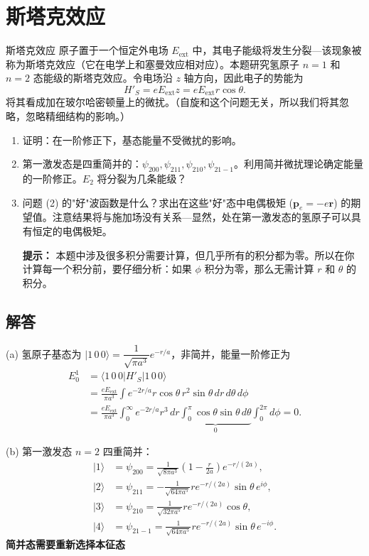 \section{斯塔克效应}
\begin{problembox}{斯塔克效应}
	原子置于一个恒定外电场 $E_{\mathrm{ext}}$ 中，其电子能级将发生分裂---该现象被称为斯塔克效应（它在电学上和塞曼效应相对应）。本题研究氢原子 $n=1$ 和 $n=2$ 态能级的斯塔克效应。令电场沿 $z$ 轴方向，因此电子的势能为
	\[
	H'_S = e E_{\mathrm{ext}} z = e E_{\mathrm{ext}} r \cos\theta.
	\]
	将其看成加在玻尔哈密顿量上的微扰。（自旋和这个问题无关，所以我们将其忽略，忽略精细结构的影响。）
	
	\begin{enumerate}
		\item 证明：在一阶修正下，基态能量不受微扰的影响。
		
		\item 第一激发态是四重简并的：$\psi_{200}, \psi_{211}, \psi_{210}, \psi_{21-1}$。利用简并微扰理论确定能量的一阶修正。$E_2$ 将分裂为几条能级？
		
		\item 问题 (2) 的"好"波函数是什么？求出在这些"好"态中电偶极矩 ($\mathbf{p}_e = -e\mathbf{r}$) 的期望值。注意结果将与施加场没有关系---显然，处在第一激发态的氢原子可以具有恒定的电偶极矩。
		
		\textbf{提示：} 本题中涉及很多积分需要计算，但几乎所有的积分都为零。所以在你计算每一个积分前，要仔细分析：如果 $\phi$ 积分为零，那么无需计算 $r$ 和 $\theta$ 的积分。
	\end{enumerate}
\end{problembox}

\subsection*{解答}

(a) 氢原子基态为 $|1\,0\,0\rangle = \dfrac{1}{\sqrt{\pi a^3}} e^{-r/a}$，非简并，能量一阶修正为
\begin{align*}
	E_0^1 &= \langle 1\,0\,0 | H'_S | 1\,0\,0 \rangle \\
	&= \frac{e E_{\mathrm{ext}}}{\pi a^3} \int e^{-2r/a} r \cos\theta \, r^2 \sin\theta \, dr\, d\theta\, d\phi \\
	&= \frac{e E_{\mathrm{ext}}}{\pi a^3} \int_0^\infty e^{-2r/a} r^3 \, dr \underbrace{\int_0^\pi \cos\theta \sin\theta \, d\theta}_{0} \int_0^{2\pi} d\phi = 0.
\end{align*}

(b) 第一激发态 \(n=2\) 四重简并：
\begin{align*}
	|1\rangle &= \psi_{200} = \frac{1}{\sqrt{8\pi a^3}} \left(1 - \frac{r}{2a}\right) e^{-r/(2a)}, \\
	|2\rangle &= \psi_{211} = -\frac{1}{\sqrt{64\pi a^5}} r e^{-r/(2a)} \sin\theta \, e^{i\phi}, \\
	|3\rangle &= \psi_{210} = \frac{1}{\sqrt{32\pi a^5}} r e^{-r/(2a)} \cos\theta, \\
	|4\rangle &= \psi_{21-1} = \frac{1}{\sqrt{64\pi a^5}} r e^{-r/(2a)} \sin\theta \, e^{-i\phi}.
\end{align*}
\textbf{简并态需要重新选择本征态}

